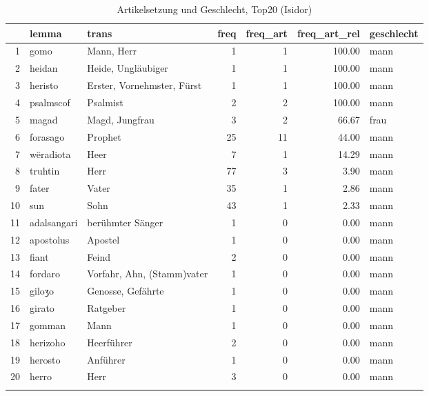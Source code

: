 \begin{table}[ht]
\centering
\begin{tabular}{rllrrrl}
  \lsptoprule
 & lemma & trans & freq & freq\_art & freq\_art\_rel & geschlecht \\ 
  \midrule
1 & gomo & Mann, Herr &   1 &   1 & 100.00 & mann \\ 
  2 & heidan & Heide, Ungläubiger &   1 &   1 & 100.00 & mann \\ 
  3 & heristo & Erster, Vornehmster, Fürst &   1 &   1 & 100.00 & mann \\ 
  4 & psalmscof & Psalmist &   2 &   2 & 100.00 & mann \\ 
  5 & magad & Magd, Jungfrau &   3 &   2 & 66.67 & frau \\ 
  6 & forasago & Prophet &  25 &  11 & 44.00 & mann \\ 
  7 & wëradiota & Heer &   7 &   1 & 14.29 & mann \\ 
  8 & truhtin & Herr &  77 &   3 & 3.90 & mann \\ 
  9 & fater & Vater &  35 &   1 & 2.86 & mann \\ 
  10 & sun & Sohn &  43 &   1 & 2.33 & mann \\ 
  11 & adalsangari & berühmter Sänger &   1 &   0 & 0.00 & mann \\ 
  12 & apostolus & Apostel &   1 &   0 & 0.00 & mann \\ 
  13 & fiant & Feind &   2 &   0 & 0.00 & mann \\ 
  14 & fordaro & Vorfahr, Ahn, (Stamm)vater &   1 &   0 & 0.00 & mann \\ 
  15 & giloʒo & Genosse, Gefährte &   1 &   0 & 0.00 & mann \\ 
  16 & girato & Ratgeber &   1 &   0 & 0.00 & mann \\ 
  17 & gomman & Mann &   1 &   0 & 0.00 & mann \\ 
  18 & herizoho & Heerführer &   2 &   0 & 0.00 & mann \\ 
  19 & herosto & Anführer &   1 &   0 & 0.00 & mann \\ 
  20 & herro & Herr &   3 &   0 & 0.00 & mann \\ 
   \lspbottomrule
\end{tabular}
\caption{Artikelsetzung und Geschlecht, Top20  (Isidor)} 
\end{table}
